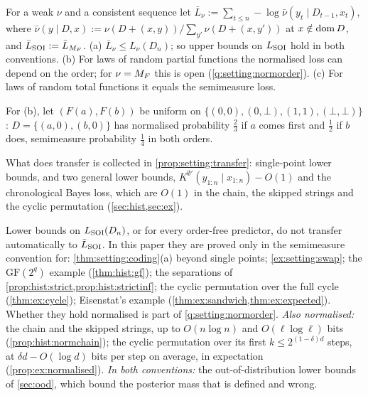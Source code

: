 \begin{proposition}[Normalisation]\label{prop:setting:normalise}
For a weak $\nu$ and a consistent sequence let $\bar L_\nu:=\sum_{t\le n}-\log\bar\nu(y_t\mid D_{t-1},x_t)$, where $\bar\nu(y\mid D,x):=\nu(D+(x,y))/\sum_{y'}\nu(D+(x,y'))$ at $x\notin\operatorname{dom} D$, and $\bar{L}_{\mathrm{SOI}}:=\bar L_{M_{F}}$. (a) $\bar L_\nu\le L_\nu(D_n)$; so upper bounds on $L_{\mathrm{SOI}}$ hold in both conventions. (b) For laws of random partial functions the normalised loss can depend on the order; for $\nu=M_{F}$ this is open (\cref{q:setting:normorder}). (c) For laws of random total functions it equals the semimeasure loss.
\end{proposition}

For (b), let $(F(a),F(b))$ be uniform on $\{(0,0),(0,\bot),(1,1),(\bot,\bot)\}$: $D=\{(a,0),(b,0)\}$ has normalised probability $\frac23$ if $a$ comes first and $\frac12$ if $b$ does, semimeasure probability $\frac14$ in both orders.

What does transfer is collected in \cref{prop:setting:transfer}: single-point lower bounds, and two general lower bounds, $K^{\emptyset'}(y_{1:n}\mid x_{1:n})-O(1)$ and the chronological Bayes loss, which are $O(1)$ in the chain, the skipped strings and the cyclic permutation (\cref{sec:hist,sec:ex}).

\begin{remark}\label{rem:setting:conventions}
Lower bounds on $L_{\mathrm{SOI}}(D_n)$, or for every order-free predictor, do not transfer automatically to $\bar{L}_{\mathrm{SOI}}$. In this paper they are proved only in the semimeasure convention for: \cref{thm:setting:coding}(a) beyond single points; \cref{ex:setting:swap}; the $\mathrm{GF}(2^q)$ example (\cref{thm:hist:gf}); the separations of \cref{prop:hist:strict,prop:hist:strictinf}; the cyclic permutation over the full cycle (\cref{thm:ex:cycle}); Eisenstat's example (\cref{thm:ex:sandwich,thm:ex:expected}). Whether they hold normalised is part of \cref{q:setting:normorder}.
\emph{Also normalised:} the chain and the skipped strings, up to $O(n\log n)$ and $O(\ell\log\ell)$ bits (\cref{prop:hist:normchain}); the cyclic permutation over its first $k\le2^{(1-\delta)d}$ steps, at $\delta d-O(\log d)$ bits per step on average, in expectation (\cref{prop:ex:normalised}).
\emph{In both conventions:} the out-of-distribution lower bounds of \cref{sec:ood}, which bound the posterior mass that is defined and wrong.
\end{remark}


